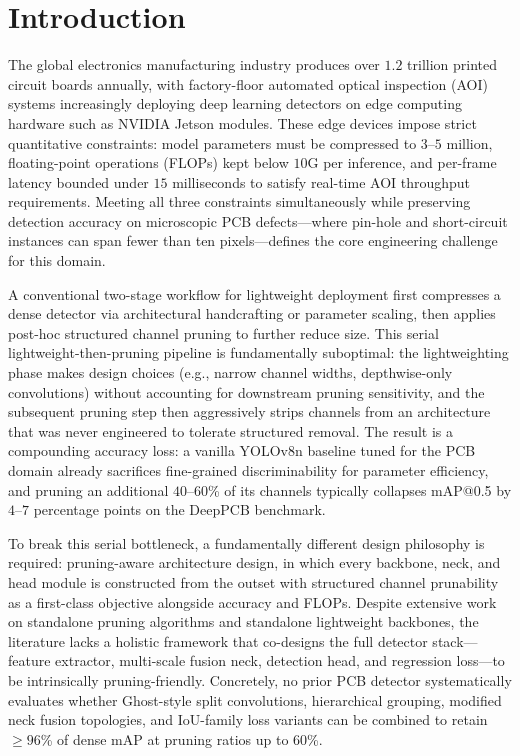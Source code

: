 ﻿\documentclass[conference]{IEEEtran}
\newcommand{\simulated}[1]{#1}
\begin{document}
\section{Introduction}
\label{sec:introduction}

The global electronics manufacturing industry produces over $\simulated{1.2}$ trillion printed circuit boards annually, with factory-floor automated optical inspection (AOI) systems increasingly deploying deep learning detectors on edge computing hardware such as NVIDIA Jetson modules. These edge devices impose strict quantitative constraints: model parameters must be compressed to $\simulated{3}$--$\simulated{5}$ million, floating-point operations (FLOPs) kept below $\simulated{10}$G per inference, and per-frame latency bounded under $\simulated{15}$ milliseconds to satisfy real-time AOI throughput requirements. Meeting all three constraints simultaneously while preserving detection accuracy on microscopic PCB defects—where pin-hole and short-circuit instances can span fewer than ten pixels—defines the core engineering challenge for this domain.

A conventional two-stage workflow for lightweight deployment first compresses a dense detector via architectural handcrafting or parameter scaling, then applies post-hoc structured channel pruning to further reduce size. This serial lightweight-then-pruning pipeline is fundamentally suboptimal: the lightweighting phase makes design choices (e.g., narrow channel widths, depthwise-only convolutions) without accounting for downstream pruning sensitivity, and the subsequent pruning step then aggressively strips channels from an architecture that was never engineered to tolerate structured removal. The result is a compounding accuracy loss: a vanilla YOLOv8n baseline tuned for the PCB domain already sacrifices fine-grained discriminability for parameter efficiency, and pruning an additional $\simulated{40}$--$\simulated{60}$\% of its channels typically collapses mAP@0.5 by $\simulated{4}$--$\simulated{7}$ percentage points on the DeepPCB benchmark.

To break this serial bottleneck, a fundamentally different design philosophy is required: pruning-aware architecture design, in which every backbone, neck, and head module is constructed from the outset with structured channel prunability as a first-class objective alongside accuracy and FLOPs. Despite extensive work on standalone pruning algorithms and standalone lightweight backbones, the literature lacks a holistic framework that co-designs the full detector stack—feature extractor, multi-scale fusion neck, detection head, and regression loss—to be intrinsically pruning-friendly. Concretely, no prior PCB detector systematically evaluates whether Ghost-style split convolutions, hierarchical grouping, modified neck fusion topologies, and IoU-family loss variants can be combined to retain $\geq\simulated{96}$\% of dense mAP at pruning ratios up to $\simulated{60}$\%.
\end{document}
